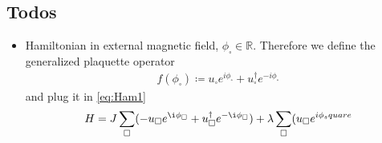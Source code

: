\documentclass[12pt, a4paper, twoside, titlepage]{article}
\begin{document}
\subsection{Todos}
\begin{itemize}
  \item Hamiltonian in external magnetic field, $\phi_\square\in \mathbb{R}$. 
    Therefore we define the generalized plaquette operator
    \begin{align}
      f(\phi_\square) \coloneqq u_\square e^{i\phi_\square}+ u^\dagger_\square e^{-i\phi_\square}
    \end{align}
    and plug it in \eqref{eq:Ham1}
    \begin{align}
      H =J \sum_{\square} ( - u_\square e^{\i \phi_\square} + u^\dagger_\square e^{-\i \phi_\square}) + \lambda \sum_\square (u_\square e^{i\phi_square}
    \end{align}
\end{itemize}


\end{document}
